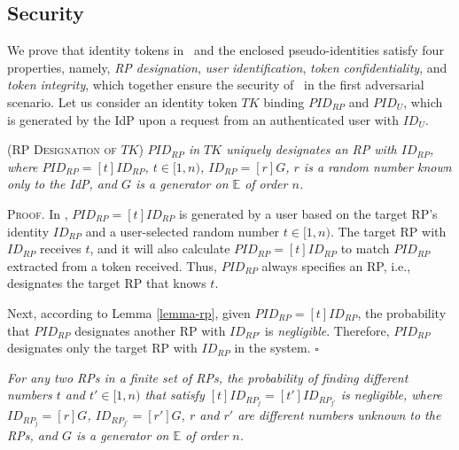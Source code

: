 \subsection{Security}
\label{analysis-security}

We prove that identity tokens in \usso\ and the enclosed pseudo-identities satisfy four properties, namely, \emph{RP designation}, \emph{user identification}, \emph{token confidentiality}, and \emph{token integrity}, which together ensure the security of \usso\ in the first adversarial scenario.
Let us consider an identity token $TK$ binding $PID_{RP}$ and $PID_U$, which is generated by the IdP upon a request from an authenticated user with $ID_U$.

\begin{thm}
\textsc{(RP Designation of $TK$)}  \emph{$PID_{RP}$ in $TK$ uniquely designates an RP with $ID_{RP}$, where $PID_{RP}= [t]ID_{RP}$, $t \in [1,n)$, $ID_{RP} = [r]G$, $r$ is a random number known only to the IdP, and $G$ is a generator on $\mathbb{E}$ of order $n$.}
\label{thm-rp-designation}
\end{thm}


\noindent\textsc{Proof.} In \usso, $PID_{RP}=[t]ID_{RP}$ is generated by a user based on the target RP's identity $ID_{RP}$ and a user-selected random number $t \in [1,n)$.
The target RP with $ID_{RP}$ receives $t$, and it will also calculate $PID_{RP}=[t]ID_{RP}$ to match $PID_{RP}$ extracted from a token received.
Thus, $PID_{RP}$ always specifies an RP, i.e., %
designates the target RP that knows $t$.

Next, according to Lemma \ref{lemma-rp}, given $PID_{RP} = [t]ID_{RP}$, the probability that $PID_{RP}$ designates another RP with $ID_{RP'}$ is \emph{negligible}. %
Therefore, $PID_{RP}$ designates only the target RP with $ID_{RP}$ in the system.  \hfill $\square$


\begin{lemma}
\emph{For any two RPs in a finite set of RPs, the probability of finding different numbers $t$ and $t' \in [1,n)$ that satisfy $[t]ID_{RP_j} = [t']ID_{RP_{j'}}$ is negligible, where $ID_{RP_j}=[r]G$, $ID_{RP_{j'}}=[r']G$, $r$ and $r'$ are different numbers unknown to the RPs, and $G$ is a generator on $\mathbb{E}$ of order $n$.}
\label{lemma-rp}
\end{lemma}


